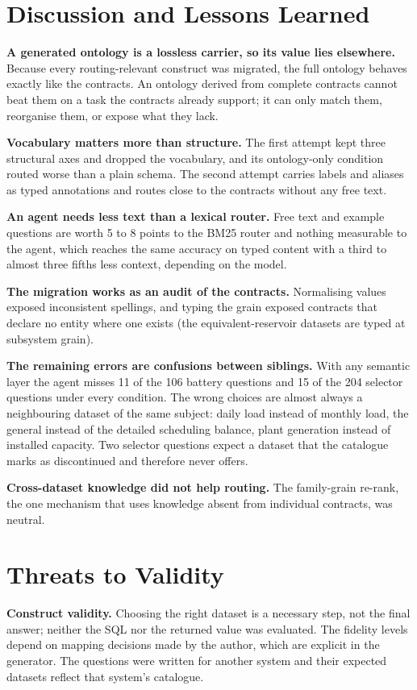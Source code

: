 \section{Discussion and Lessons Learned}
\textbf{A generated ontology is a lossless carrier, so its value lies elsewhere.} Because
every routing-relevant construct was migrated, the full ontology behaves exactly like the
contracts. An ontology derived from complete contracts cannot beat them on a task the
contracts already support; it can only match them, reorganise them, or expose what they lack.

\textbf{Vocabulary matters more than structure.} The first attempt kept three structural
axes and dropped the vocabulary, and its ontology-only condition routed worse than a plain
schema. The second attempt carries labels and aliases as typed annotations and routes close
to the contracts without any free text.

\textbf{An agent needs less text than a lexical router.} Free text and example questions are
worth 5 to 8 points to the BM25 router and nothing measurable to the agent, which reaches the
same accuracy on typed content with a third to almost three fifths less context, depending on the model.

\textbf{The migration works as an audit of the contracts.} Normalising values exposed
inconsistent spellings, and typing the grain exposed contracts that declare no entity where
one exists (the equivalent-reservoir datasets are typed at subsystem grain).

\textbf{The remaining errors are confusions between siblings.} With any semantic layer the
agent misses 11 of the 106 battery questions and 15 of the 204 selector questions under
every condition. The wrong choices are almost always a neighbouring dataset of the same
subject: daily load instead of monthly load, the general instead of the detailed scheduling
balance, plant generation instead of installed capacity. Two selector questions expect a
dataset that the catalogue marks as discontinued and therefore never offers.

\textbf{Cross-dataset knowledge did not help routing.} The family-grain re-rank, the one
mechanism that uses knowledge absent from individual contracts, was neutral.

\section{Threats to Validity}
\textbf{Construct validity.} Choosing the right dataset is a necessary step, not the final
answer; neither the SQL nor the returned value was evaluated. The fidelity levels depend on
mapping decisions made by the author, which are explicit in the generator. The questions
were written for another system and their expected datasets reflect that system's catalogue.

